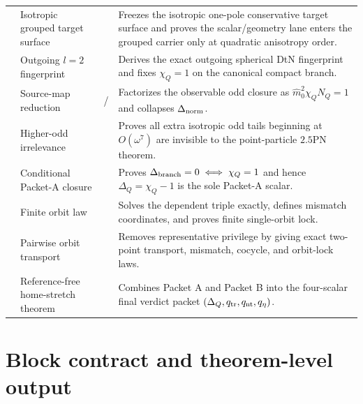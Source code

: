 \begin{longtable}{@{}L{0.075\textwidth}L{0.34\textwidth}L{0.20\textwidth}L{0.33\textwidth}@{}}
 & Isotropic grouped target surface & \StatusExactClosure{} & Freezes the isotropic one-pole conservative target surface and proves the scalar/geometry lane enters the grouped carrier only at quadratic anisotropy order. \\
 & Outgoing \(l=2\) fingerprint & \StatusExactClosure{} & Derives the exact outgoing spherical DtN fingerprint and fixes \(\chi_Q=1\) on the canonical compact branch. \\
 & Source-map reduction & \StatusExactClosure{} / \StatusReduced{} & Factorizes the observable odd closure as \(\widehat m_0^{2}\chi_QN_Q=1\) and collapses \(\Delta_{\rm norm}\). \\
 & Higher-odd irrelevance & \StatusExactClosure{} & Proves all extra isotropic odd tails beginning at \(O(\omega^7)\) are invisible to the point-particle \(2.5\)PN theorem. \\
 & Conditional Packet-A closure & \StatusExactClosure{} & Proves \(\Delta_{\rm branch}=0\iff \chi_Q=1\) and hence \(\Delta_Q=\chi_Q-1\) is the sole Packet-A scalar. \\
 & Finite orbit law & \StatusExactClosure{} & Solves the dependent triple exactly, defines mismatch coordinates, and proves finite single-orbit lock. \\
 & Pairwise orbit transport & \StatusExactClosure{} & Removes representative privilege by giving exact two-point transport, mismatch, cocycle, and orbit-lock laws. \\
 & Reference-free home-stretch theorem & \StatusExactClosure{} & Combines Packet A and Packet B into the four-scalar final verdict packet \((\Delta_Q,q_{\rm tr},q_{\rm nt},q_\eta)\). \\
\bottomrule
\end{longtable}


\section{Block contract and theorem-level output}
\label{sec:app-part05-block-contract}


